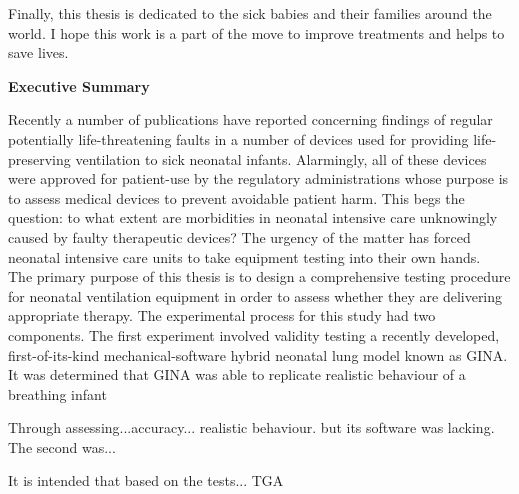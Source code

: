 \documentclass[12pt, openany, oneside]{book}
\newcommand\blankpage{
	\null
	\thispagestyle{empty}
	\addtocounter{page}{-1}
	\newpage
	}
\begin{document}
Finally, this thesis is dedicated to the sick babies and their families around the world. I hope this work is a part of the move to improve treatments and helps to save lives.

\afterpage{\blankpage}





\clearpage
{}
\begin{center}
\vspace*{\fill}
{\Large \bfseries Executive Summary}\\
\end{center}

Recently a number of publications have reported concerning findings of regular potentially life-threatening faults in a number of devices used for providing life-preserving ventilation to sick neonatal infants. Alarmingly, all of these devices were approved for patient-use by the regulatory administrations whose  purpose is to assess medical devices to prevent avoidable patient harm. 
This begs the question: to what extent are morbidities in neonatal intensive care unknowingly caused by faulty therapeutic devices? The urgency of the matter has forced neonatal intensive care units to take equipment testing into their own hands. \\

The primary purpose of this thesis is to design a comprehensive testing procedure for neonatal ventilation equipment in order to assess whether they are delivering appropriate therapy. The experimental process for this study had two components. The first experiment involved validity testing a recently developed, first-of-its-kind  mechanical-software hybrid neonatal lung model known as GINA.  It was determined that GINA was able to replicate realistic behaviour of a breathing infant 

Through assessing...accuracy... realistic behaviour. but its software was lacking. The second was...


It is intended that based on the tests... TGA





\vspace*{\fill}


\clearpage
{}
\tableofcontents
\listoffigures
\listoftables

\end{document}
